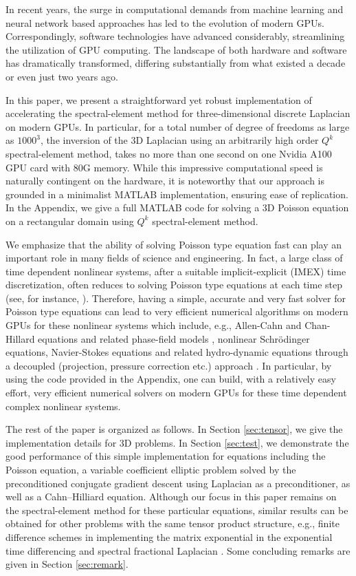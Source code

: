 \documentclass{article}
\begin{document}
In recent years, the surge in computational demands from machine learning and neural network based approaches has led to the evolution of modern GPUs. Correspondingly, software technologies have advanced considerably, streamlining the utilization of
GPU computing.
The landscape of both hardware and software has dramatically transformed, differing substantially from what existed a decade or even just two years ago.

In this paper, we present a straightforward yet robust implementation of accelerating the spectral-element method for three-dimensional discrete Laplacian 
 on modern GPUs. In particular, for a total number of degree of freedoms as large as $1000^3$, the inversion of the 3D Laplacian using an arbitrarily high order $Q^k$ spectral-element method, takes no more than one second on one Nvidia A100 GPU card with 80G memory. 
While this impressive computational speed is naturally contingent on the hardware, it is noteworthy that our approach is grounded in a minimalist MATLAB implementation, ensuring ease of replication. In the Appendix, we give a full MATLAB code for solving a 3D Poisson equation on a rectangular domain using $Q^k$ spectral-element method. 

We emphasize that the ability of solving Poisson type equation fast can play an important role in many fields of science and engineering. In fact, a large class of time dependent  nonlinear systems, after a suitable implicit-explicit (IMEX) time discretization,   often reduces to solving  Poisson type equations at each time step (see, for instance, \cite{shen2019new}). Therefore, having a simple, accurate  and very fast solver for Poisson type equations can lead to very efficient numerical algorithms  on modern GPUs for these nonlinear systems which include, e.g., Allen-Cahn and Chan-Hillard equations and related phase-field models \cite{shen2019new}, nonlinear Schr\"odinger equations, Navier-Stokes equations and related hydro-dynamic equations through a decoupled (projection, pressure correction etc.) approach \cite{guermond2006overview}. In particular, by using the code provided in the Appendix, one can build, with a relatively easy effort,  very efficient numerical   solvers  on modern GPUs for these time dependent complex nonlinear systems. 
  

The rest of the paper is organized as follows. In Section \ref{sec:tensor}, we give the  implementation details for 3D problems. In Section \ref{sec:test}, we demonstrate  the good performance of this simple implementation for equations including the Poisson equation,  a variable coefficient elliptic problem solved by the preconditioned conjugate gradient descent using Laplacian as a preconditioner, 
as well as a Cahn--Hilliard equation.  Although our focus in this paper remains on the spectral-element method for these particular equations, similar results can be obtained  for other problems with the same tensor product structure,  e.g., finite difference schemes in implementing the matrix exponential in the exponential time differencing \cite{du2019maximum} and spectral fractional Laplacian \cite{chen2020efficient}. 
Some concluding remarks are given in Section \ref{sec:remark}. 
\end{document}
